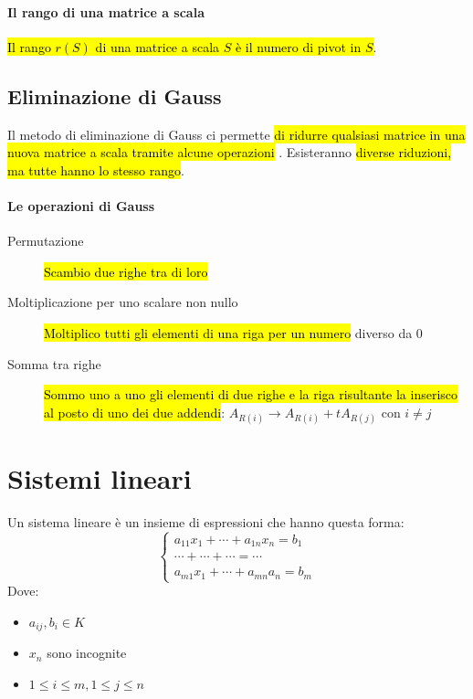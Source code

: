 \paragraph{Il rango di una matrice a scala} \hl{Il rango $r(S)$ di una matrice
a scala $S$ è il numero di pivot in $S$}.

\subsection{Eliminazione di Gauss}
Il metodo di eliminazione di Gauss ci permette \hl{di ridurre qualsiasi matrice
in una nuova matrice a scala tramite alcune operazioni }. Esisteranno \hl{diverse
riduzioni, ma tutte hanno lo stesso rango}.

\paragraph{Le operazioni di Gauss}
\begin{description}
    \item[Permutazione] \hl{Scambio due righe tra di loro}
    \item[Moltiplicazione per uno scalare non nullo] \hl{Moltiplico tutti gli elementi
        di una riga per un numero} diverso da $0$
    \item[Somma tra righe] \hl{Sommo uno a uno gli elementi di due righe e la riga
        risultante la inserisco al posto di uno dei due addendi}:
        $A_{R(i)} \to A_{R(i)} + tA_{R(j)} \text{ con } i \neq j$
\end{description}

\section{Sistemi lineari}
Un sistema lineare è un insieme di espressioni che hanno questa forma:
\[
    \begin{cases}
        a_{11}x_1 + \cdots + a_{1n}x_n = b_1 \\
        \cdots + \cdots + \cdots = \cdots \\
        a_{m1}x_1 + \cdots + a_{mn}a_n = b_m
    \end{cases}
\]
Dove:
\begin{itemize}
    \item $a_{ij}, b_i \in K$
    \item $x_n$ sono incognite
    \item $1 \leq i \leq m, 1 \leq j \leq n$
\end{itemize}

